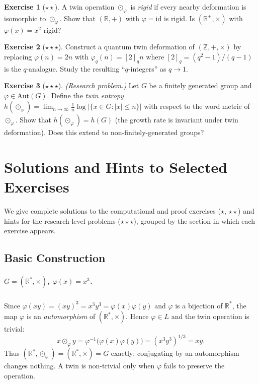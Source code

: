 \documentclass[11pt,a4paper,openany]{book}
\theoremstyle{plain}
\theoremstyle{definition}
\newtheorem{exercise}{Exercise}[chapter]
\newcommand{\twing}[1]{\odot_{#1}}
\newcommand{\lingroup}{L}
\newcommand{\RR}{\mathbb{R}}
\newcommand{\ZZ}{\mathbb{Z}}
\newcommand{\id}{\mathrm{id}}
\newcommand{\Aut}{\mathrm{Aut}}
\begin{document}
\begin{exercise}[$\star\star$]
A twin operation $\twing{\varphi}$ is \emph{rigid} if every nearby deformation is isomorphic to $\twing{\varphi}$. Show that $(\RR, +)$ with $\varphi = \id$ is rigid. Is $(\RR^+, \times)$ with $\varphi(x) = x^2$ rigid?
\end{exercise}

\begin{exercise}[$\star\star\star$]
Construct a quantum twin deformation of $(\ZZ, +, \times)$ by replacing $\varphi(n) = 2n$ with $\varphi_q(n) = [2]_q n$ where $[2]_q = (q^2 - 1)/(q - 1)$ is the $q$-analogue. Study the resulting ``$q$-integers'' as $q \to 1$.
\end{exercise}

\begin{exercise}[$\star\star\star$]
\emph{(Research problem.)} Let $G$ be a finitely generated group and $\varphi \in \Aut(G)$. Define the \emph{twin entropy} $h(\twing{\varphi}) = \lim_{n \to \infty} \frac{1}{n}\log|\{x \in G : |x| \leq n\}|$ with respect to the word metric of $\twing{\varphi}$. Show that $h(\twing{\varphi}) = h(G)$ (the growth rate is invariant under twin deformation). Does this extend to non-finitely-generated groups?
\end{exercise}


\chapter{Solutions and Hints to Selected Exercises}
\label{app:solutions}

We give complete solutions to the computational and proof exercises ($\star$, $\star\star$) and hints for the research-level problems ($\star\star\star$), grouped by the section in which each exercise appears.

\section*{Basic Construction}

\paragraph{$G=(\RR^*,\times)$, $\varphi(x)=x^3$.}
Since $\varphi(xy)=(xy)^3=x^3y^3=\varphi(x)\varphi(y)$ and $\varphi$ is a bijection of $\RR^*$, the map $\varphi$ is an \emph{automorphism} of $(\RR^*,\times)$. Hence $\varphi\in\lingroup$ and the twin operation is trivial:
\[
x\twing{\varphi}y=\varphi^{-1}\big(\varphi(x)\varphi(y)\big)=(x^3y^3)^{1/3}=xy .
\]
Thus $(\RR^*,\twing{\varphi})=(\RR^*,\times)=G$ exactly: conjugating by an automorphism changes nothing. A twin is non-trivial only when $\varphi$ fails to preserve the operation.
\end{document}
